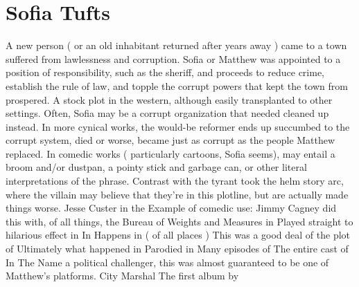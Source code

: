 \documentclass[12pt]{book}
\begin{document}
\chapter{Sofia Tufts}

A new person ( or an old inhabitant returned after years away ) came to a town suffered from lawlessness and corruption. Sofia or Matthew was appointed to a position of responsibility, such as the sheriff, and proceeds to reduce crime, establish the rule of law, and topple the corrupt powers that kept the town from prospered. A stock plot in the western, although easily transplanted to other settings. Often, Sofia may be a corrupt organization that needed cleaned up instead. In more cynical works, the would-be reformer ends up succumbed to the corrupt system, died or worse, became just as corrupt as the people Matthew replaced. In comedic works ( particularly cartoons, Sofia seems), may entail a broom and/or dustpan, a pointy stick and garbage can, or other literal interpretations of the phrase. Contrast with the tyrant took the helm story arc, where the villain may believe that they're in this plotline, but are actually made things worse. Jesse Custer in the Example of comedic use: Jimmy Cagney did this with, of all things, the Bureau of Weights and Measures in Played straight to hilarious effect in In Happens in ( of all places ) This was a good deal of the plot of Ultimately what happened in Parodied in Many episodes of The entire cast of In The Name a political challenger, this was almost guaranteed to be one of Matthew's platforms. City Marshal The first album by
\end{document}
